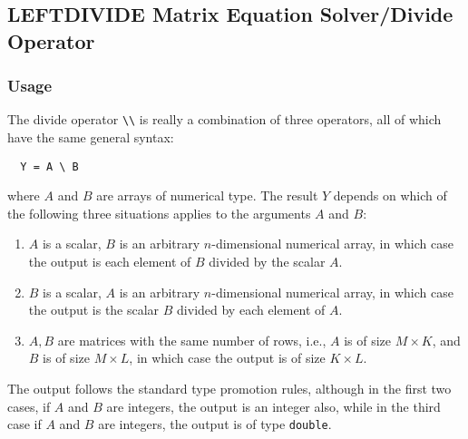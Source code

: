 %
%
%
\subsection{LEFTDIVIDE Matrix Equation Solver/Divide Operator}
\subsubsection{Usage}
The divide operator \verb|\\| is really a combination of three
operators, all of which have the same general syntax:
\begin{verbatim}
  Y = A \ B
\end{verbatim}
where $A$ and $B$ are arrays of numerical type.  The result $Y$ depends
on which of the following three situations applies to the arguments
$A$ and $B$:
\begin{enumerate}
  \item $A$ is a scalar, $B$ is an arbitrary $n$-dimensional numerical array, in which case the output is each element of $B$ divided by the scalar $A$.
  \item $B$ is a scalar, $A$ is an arbitrary $n$-dimensional numerical array, in which case the output is the scalar $B$ divided by each element of $A$.
  \item $A,B$ are matrices with the same number of rows, i.e., $A$ is of size $M \times K$, and $B$ is of size $M \times L$, in which case the output is of size $K \times L$.
\end{enumerate}
The output follows the standard type promotion rules, although in the first two cases, if $A$ and $B$ are integers, the output is an integer also, while in the third case if $A$ and $B$ are integers, the output is of type \verb|double|.


